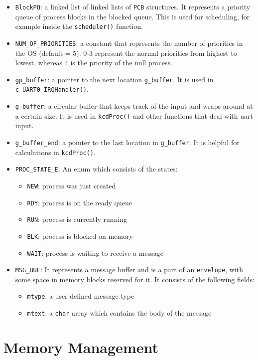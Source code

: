 \documentclass[12pt]{report}
\begin{document}
\begin{itemize}
  \item \texttt{BlockPQ}: a linked list of linked lists of \texttt{PCB} structures. It represents a priority queue of process blocks in the blocked queue. This is used for scheduling, for example inside the \texttt{scheduler()} function.
  \item \texttt{NUM_OF_PRIORITIES}: a constant that represents the number of priorities in the OS (default = 5). 0-3 represent the normal priorities from highest to lowest, whereas 4 is the priority of the null process.
  \item \texttt{gp_buffer}: a pointer to the next location \texttt{g_buffer}. It is used in \texttt{c_UART0_IRQHandler()}.
  \item \texttt{g_buffer}: a circular buffer that keeps track of the input and wraps around at a certain size. It is used in \texttt{kcdProc()} and other functions that deal with uart input.
  \item \texttt{g_buffer_end}: a pointer to the last location in \texttt{g_buffer}. It is helpful for calculations in \texttt{kcdProc()}.
  \item \texttt{PROC_STATE_E}: An enum which consists of the states:
    \begin{itemize}
      \item \texttt{NEW}: process was just created
      \item \texttt{RDY}: process is on the ready queue
      \item \texttt{RUN}: process is currently running
      \item \texttt{BLK}: process is blocked on memory
      \item \texttt{WAIT}: process is waiting to receive a message
    \end{itemize}
  \item \texttt{MSG_BUF}: It represents a message buffer and is a part of an \texttt{envelope}, with some space in memory blocks reserved for it. It consists of the following fields:
    \begin{itemize}
      \item \texttt{mtype}: a user defined message type
      \item \texttt{mtext}: a \texttt{char} array which contains the body of the message
    \end{itemize}
\end{itemize}

\section{Memory Management}
\end{document}
